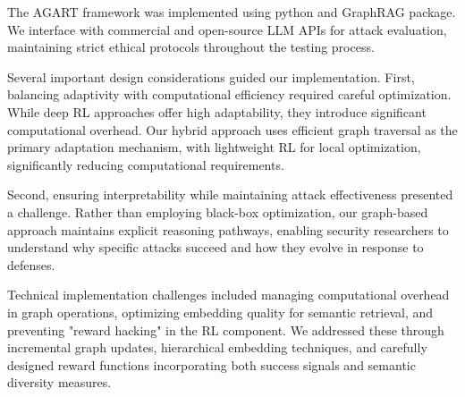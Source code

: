 The AGART framework was implemented using python and GraphRAG package. We interface with commercial and open-source LLM APIs for attack evaluation, maintaining strict ethical protocols throughout the testing process. 

Several important design considerations guided our implementation. First, balancing adaptivity with computational efficiency required careful optimization. While deep RL approaches offer high adaptability, they introduce significant computational overhead. Our hybrid approach uses efficient graph traversal as the primary adaptation mechanism, with lightweight RL for local optimization, significantly reducing computational requirements.

Second, ensuring interpretability while maintaining attack effectiveness presented a challenge. Rather than employing black-box optimization, our graph-based approach maintains explicit reasoning pathways, enabling security researchers to understand why specific attacks succeed and how they evolve in response to defenses.

Technical implementation challenges included managing computational overhead in graph operations, optimizing embedding quality for semantic retrieval, and preventing "reward hacking" in the RL component. We addressed these through incremental graph updates, hierarchical embedding techniques, and carefully designed reward functions incorporating both success signals and semantic diversity measures.
